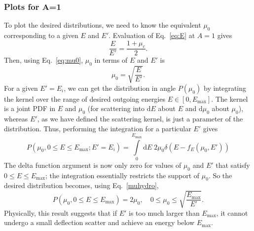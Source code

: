 \documentclass[12pt]{article}
\renewcommand{\d}{\mathrm{d}}
\newenvironment{solution}[1][Solution]{\begin{trivlist}
\item[\hskip \labelsep {\bfseries #1} {\hspace{-0.2em}\bfseries:}]\hspace{0.3in}\newline}{\end{trivlist}}
\begin{document}
\begin{solution}
\subsubsection*{Plots for A=1}

To plot the desired distributions, we need to know the equivalent $\mu_0$
corresponding to a given $E$ and $E'$.  Evaluation of Eq.~\eqref{eq:E} at $A=1$ gives
\begin{equation}
    \frac{E}{E'} = \frac{1+\mu_c}{2}.
\end{equation}
Then, using Eq.~\eqref{eq:mu0}, $\mu_0$ in terms of $E$ and $E'$ is 
\begin{equation}\label{muhydro}
    \mu_0 = \sqrt{\frac{E}{E'}}.
\end{equation}
For a given $E'=E_i$, we can get the distribution in angle $P(\mu_0)$ by integrating the
kernel over the range of desired outgoing energies $E\in[0,E_{\max}]$. The
kernel is a joint PDF in $E$ and $\mu_0$ (for scattering into $\d E$ about $E$ and $\d
\mu_0$ about $\mu_0$), whereas $E'$, as we have defined the scattering kernel, is just a parameter of the distribution.
Thus, performing the integration for a particular $E'$ gives
\begin{equation}
    P(\mu_0,0\leq E\leq E_{\max};E'=E_i) = \int\limits_0^{E_{\max}}\!\d E \;2\mu_0
    \delta(E-f_E(\mu_0,E'))
\end{equation}
The delta function argument is now only zero for values of $\mu_0$ and $E'$ that
satisfy $0\leq E \leq E_{\max}$; the integration essentially restricts the support of
$\mu_0$.  So the desired distribution becomes, using Eq.~\eqref{muhydro},
\begin{equation} 
    P(\mu_0,0\leq E\leq E_{\max}) = 2\mu_0,\quad 0\leq \mu_0 \leq
    \sqrt{\frac{E_{\max}}{E'}}.
\end{equation}
Physically, this result suggests that if $E'$ is too much larger than $E_{\max}$, it
cannot undergo a small deflection scatter and achieve an energy below $E_{\max}$.


\end{solution}
\end{document}
